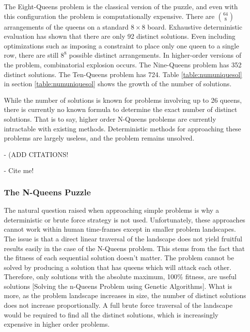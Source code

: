 \documentclass{sig-alternate}
\begin{document}
The Eight-Queens problem is the classical version of the puzzle, and even with this configuration the problem is computationally expensive. There are {$64 \choose 8$} arrangements of the queens on a standard {$8\times{}8$} board. Exhaustive deterministic evaluation has shown that there are only 92 distinct solutions. Even including optimizations such as imposing a constraint to place only one queen to a single row, there are still {$8^8$} possible distinct arrangements. In higher-order versions of the problem, combinatorial explosion occurs. The Nine-Queens problem has 352 distinct solutions. The Ten-Queens problem has 724. Table \ref{table:numuniquesol} in section \ref{table:numuniquesol} shows the growth of the number of solutions. 

While the number of solutions is known for problems involving up to 26 queens, there is currently no known formula to determine the exact number of distinct solutions. That is to say, higher order N-Queens problems are currently intractable with existing methods. Deterministic methods for approaching these problems are largely useless, and the problem remains unsolved.

- (ADD CITATIONS!
  
- Cite me!\cite{crawford1992solving,homaifar1992e1,andrews2006investigation,tuson1998adapting, wolpert1997no,srinivas1994adaptive,goldberg1988genetic}

\subsubsection{The N-Queens Puzzle}
The natural question raised when approaching simple problems is why a deterministic or brute force strategy is not used. Unfortunately, these approaches cannot work within human time-frames except in smaller problem landscapes. The issue is that a direct linear traversal of the landscape does not yield fruitful results easily in the case of the N-Queens problem. This stems from the fact that the fitness of each sequential solution doesn't matter. The problem cannot be solved by producing a solution that has queens which will attack each other. Therefore, only solutions with the absolute maximum, 100\% fitness, are useful solutions [Solving the n-Queens Problem using Genetic Algorithms]. What is more, as the problem landscape increases in size, the number of distinct solutions does not increase proportionally. A full brute force traversal of the landscape would be required to find all the distinct solutions, which is increasingly expensive in higher order problems.
\end{document}
